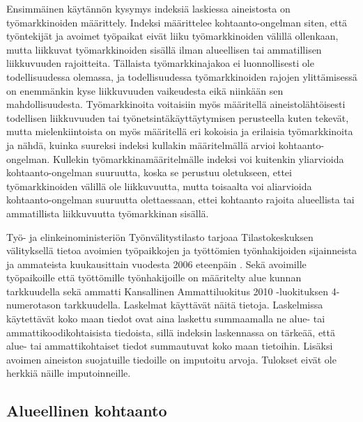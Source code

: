 \documentclass[12pt]{article}
\begin{document}
Ensimmäinen käytännön kysymys indeksiä laskiessa aineistosta on työmarkkinoiden määrittely. Indeksi määrittelee kohtaanto-ongelman siten, että työntekijät ja avoimet työpaikat eivät liiku työmarkkinoiden välillä ollenkaan, mutta liikkuvat työmarkkinoiden sisällä ilman alueellisen tai ammatillisen liikkuvuuden rajoitteita. Tällaista työmarkkinajakoa ei luonnollisesti ole todellisuudessa olemassa, ja todellisuudessa työmarkkinoiden rajojen ylittämisessä on enemmänkin kyse liikkuvuuden vaikeudesta eikä niinkään sen mahdollisuudesta. Työmarkkinoita voitaisiin myös määritellä aineistolähtöisesti todellisen liikkuvuuden tai työnetsintäkäyttäytymisen perusteella kuten  tekevät, mutta mielenkiintoista on myös määritellä eri kokoisia ja erilaisia työmarkkinoita ja nähdä, kuinka suureksi indeksi kullakin määritelmällä arvioi kohtaanto-ongelman. Kullekin työmarkkinamääritelmälle indeksi voi kuitenkin yliarvioida kohtaanto-ongelman suuruutta, koska se perustuu oletukseen, ettei työmarkkinoiden välillä ole liikkuvuutta, mutta toisaalta voi aliarvioida kohtaanto-ongelman suuruutta olettaessaan, ettei kohtaanto rajoita alueellista tai ammatillista liikkuvuutta työmarkkinan sisällä. 

Työ- ja elinkeinoministeriön Työnvälitystilasto tarjoaa Tilastokeskuksen välityksellä tietoa avoimien työpaikkojen ja työttömien työnhakijoiden sijainneista ja ammateista kuukausittain vuodesta 2006 eteenpäin \cite{svt2011}. Sekä avoimille työpaikoille että työttömille työnhakijoille on määritelty alue kunnan tarkkuudella sekä ammatti Kansallinen Ammattiluokitus 2010 -luokituksen 4-numerotason tarkkuudella. Laskelmat käyttävät näitä tietoja. Laskelmissa käytettävät koko maan tiedot ovat aina laskettu summaamalla ne alue- tai ammattikoodikohtaisista tiedoista, sillä indeksin laskennassa on tärkeää, että alue- tai ammattikohtaiset tiedot summautuvat koko maan tietoihin. Lisäksi avoimen aineiston suojatuille tiedoille on imputoitu arvoja. Tulokset eivät ole herkkiä näille imputoinneille.

\subsection{Alueellinen kohtaanto} \label{section:alueellinen_kohtaanto}
\end{document}
